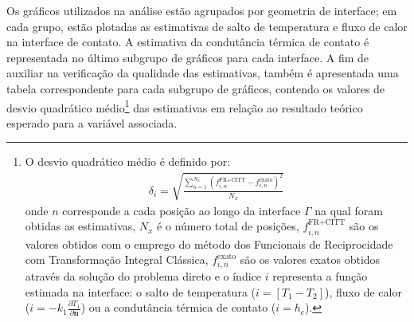 Os gráficos utilizados na análise estão agrupados por geometria de interface; em cada grupo, estão plotadas as estimativas de salto de temperatura e fluxo de calor na interface de contato. A estimativa da condutância térmica de contato é representada no último subgrupo de gráficos para cada interface. A fim de auxiliar na verificação da qualidade das estimativas, também é apresentada uma tabela correspondente para cada subgrupo de gráficos, contendo os valores de desvio quadrático médio\footnote{O desvio quadrático médio é definido por:
	\begin{align}
	\delta_i = \sqrt{\frac{\sum_{n=1}^{N_x} \left(f^{\text{FR}+\text{CITT}}_{i,n} - f_{i,n}^{\text{exato}}\right)^2 }{N_x}}
	\end{align}
	onde $n$ corresponde a cada posição ao longo da interface $\Gamma$ na qual foram obtidas as estimativas, $N_x$ é o número total de posições, $f^{\text{FR}+\text{CITT}}_{i,n}$ são os valores obtidos com o emprego do método dos Funcionais de Reciprocidade com Transformação Integral Clássica, $f_{i,n}^{\text{exato}}$ são os valores exatos obtidos através da solução do problema direto e o índice $i$ representa a função estimada na interface: o salto de temperatura ($i = [T_1 - T_2]$), fluxo de calor ($i = -k_1 \frac{\partial T_1}{\partial \mathbf{n}}$) ou a condutância térmica de contato ($i = h_c$).} das estimativas em relação ao resultado teórico esperado para a variável associada.




%




